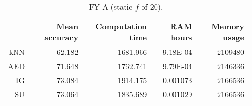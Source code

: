 \begin{table}[h]
\centering
\begin{tabular}{r|rrrr}
    & Mean accuracy & Computation time & RAM hours & Memory usage \\ \hline
kNN & 62.182                   & 1681.966         & 9.18E-04  & 2109480      \\
AED & 71.648                   & 1762.741         & 9.79E-04  & 2146336      \\
IG  & 73.084                   & 1914.175         & 0.001073  & 2166536      \\
SU  & 73.064                   & 1835.689         & 0.001029  & 2166536     
\end{tabular}
\caption{FY A (static $f$ of 20).}
\label{Table:FY_A}
\end{table}